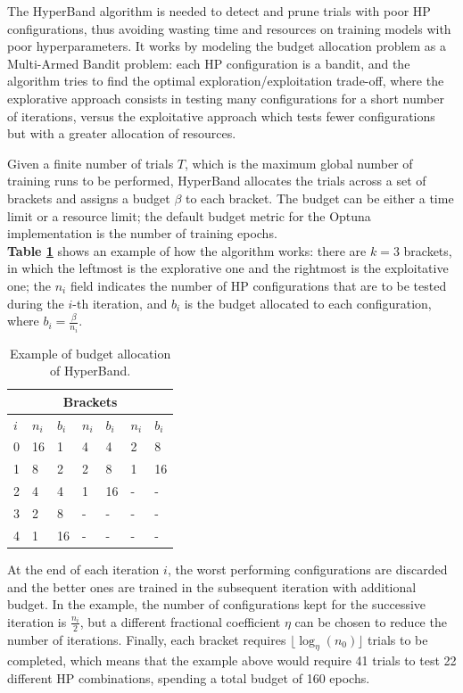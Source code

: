 \noindent
The HyperBand algorithm is needed to detect and prune trials with poor HP configurations, thus avoiding wasting time and resources on training models with poor hyperparameters. It works by modeling the budget allocation problem as a Multi-Armed Bandit problem: each HP configuration is a bandit, and the algorithm tries to find the optimal exploration/exploitation trade-off, where the explorative approach consists in testing many configurations for a short number of iterations, versus the exploitative approach which tests fewer configurations but with a greater allocation of resources.

Given a finite number of trials $T$, which is the maximum global number of training runs to be performed, HyperBand allocates the trials across a set of brackets and assigns a budget $\beta$ to each bracket. The budget can be either a time limit or a resource limit; the default budget metric for the Optuna implementation is the number of training epochs.\\
\noindent
\textbf{Table \ref{tab:hyperBand}} shows an example of how the algorithm works: there are $k = 3$ brackets, in which the leftmost is the explorative one and the rightmost is the exploitative one; the $n_i$ field indicates the number of HP configurations that are to be tested during the $i$-th iteration, and $b_i$ is the budget allocated to each configuration, where $b_i = \frac{\beta}{n_i}$.

\begin{table}[ht!]
\centering
    \begin{tabular}{ |p{.2cm}|p{1cm} p{.5cm}|p{1cm} p{.5cm}|p{1cm} p{.5cm}|  }
     \hline
     \multicolumn{7}{|c|}{Brackets} \\
     \hline
     $i$ & $n_i$ & $b_i$ & $n_i$ & $b_i$ &$n_i$ & $b_i$ \\
     \hline
     0 & 16 & 1 & 4 & 4 & 2 & 8 \\
     1 & 8  & 2 & 2 & 8 & 1 & 16\\
     2 & 4  & 4 & 1 & 16 & - & -\\
     3 & 2  & 8 & - & -  & - & -\\
     4 & 1  & 16& - & -  & - & -\\
     \hline
    \end{tabular}
    \caption{Example of budget allocation of HyperBand.} \label{tab:hyperBand}
\end{table}

\noindent
At the end of each iteration $i$, the worst performing configurations are discarded and the better ones are trained in the subsequent iteration with additional budget. In the example, the number of configurations kept for the successive iteration is $\frac{n_i}{2}$, but a different fractional coefficient $\eta$ can be chosen to reduce the number of iterations. Finally, each bracket requires $\lfloor\log_\eta(n_0)\rfloor$ trials to be completed, which means that the example above would require 41 trials to test 22 different HP combinations, spending a total budget of 160 epochs.\\

